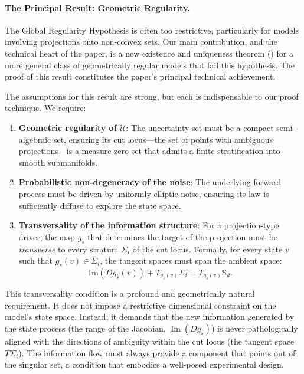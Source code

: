 \documentclass[12pt, letterpaper]{amsart}
\newcommand{\Ucal}{\mathcal{U}}
\DeclareMathOperator{\Image}{Im}
\newcommand{\Sd}{\mathbb{S}_d}
\theoremstyle{plain}
\theoremstyle{definition}
\theoremstyle{remark}
\numberwithin{equation}{section} %
\begin{document}
\paragraph{\textbf{The Principal Result: Geometric Regularity.}}
The Global Regularity Hypothesis is often too restrictive, particularly for models involving projections onto non-convex sets. Our main contribution, and the technical heart of the paper, is a new existence and uniqueness theorem () for a more general class of geometrically regular models that fail this hypothesis. The proof of this result constitutes the paper's principal technical achievement.

The assumptions for this result are strong, but each is indispensable to our proof technique. We require:
\begin{enumerate}[label=(\roman*)]
    \item \textbf{Geometric regularity of $\Ucal$}: The uncertainty set must be a compact semi-algebraic set, ensuring its cut locus—the set of points with ambiguous projections—is a measure-zero set that admits a finite stratification into smooth submanifolds.

    \item \textbf{Probabilistic non-degeneracy of the noise}: The underlying forward process must be driven by uniformly elliptic noise, ensuring its law is sufficiently diffuse to explore the state space.

    \item \textbf{Transversality of the information structure}: For a projection-type driver, the map $g_s$ that determines the target of the projection must be \emph{transverse} to every stratum $\Sigma_i$ of the cut locus. Formally, for every state $v$ such that $g_s(v) \in \Sigma_i$, the tangent spaces must span the ambient space:
    \[ \mathrm{Im}(D g_s(v)) + T_{g_s(v)}\Sigma_i = T_{g_s(v)}\Sd. \]
\end{enumerate}
This transversality condition is a profound and geometrically natural requirement. It does not impose a restrictive dimensional constraint on the model's state space. Instead, it demands that the new information generated by the state process (the range of the Jacobian, $\Image(Dg_s)$) is never pathologically aligned with the directions of ambiguity within the cut locus (the tangent space $T\Sigma_i$). The information flow must always provide a component that points out of the singular set, a condition that embodies a well-posed experimental design.
\end{document}
